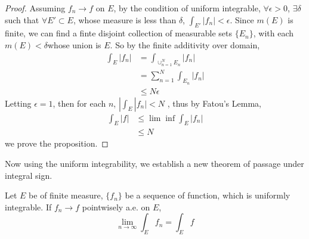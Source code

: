 \documentclass[lang=en, 12pt]{elegantbook}
\begin{document}
        \begin{proof}
            Assuming $f_n \to f$ on $E$, by the condition of uniform integrable, 
        $\forall \epsilon > 0$, $\exists \delta$ such that $\forall E' \subset E$,
        whose measure is less than $\delta$, $\int_{E'} |f_n| < \epsilon$.
            Since $m(E)$ is finite, we can find a finte disjoint collection of 
        measurable sets $\{E_n\}$, with each $m(E)< \delta$whose 
        union is $E$. So by the finite additivity over domain,
        \begin{equation*}
            \begin{aligned}
                \int_E |f_n| &= \int_{\cup_{n=1}^{N}E_n} |f_n|\\
                &= \sum_{n=1}^N \int_{E_n } |f_n|\\
                &\leq N \epsilon 
            \end{aligned}
        \end{equation*}
        Letting $\epsilon = 1$, then for each $n$, $|\int_E |f_n|<N$ , thus
        by Fatou's Lemma, 
        \begin{equation*}
            \begin{aligned}
                \int_E |f| &\leq \lim \inf \int_E |f_n|\\
                &\leq N
            \end{aligned}
        \end{equation*}
        we prove the proposition. 
        \end{proof}
            Now using the uniform integrability, we establish a new theorem of passage under integral sign.
        \begin{theorem}
            Let $E$ be of finite measure, $\{f_n\}$ be a sequence of function,
        which is uniformly integrable. If $f_n \to f$ pointwisely a.e. on 
        $E$, 
        $$\lim_{n \to \infty} \int_E f_n = \int_E f$$ 
        \end{theorem}
\end{document}
